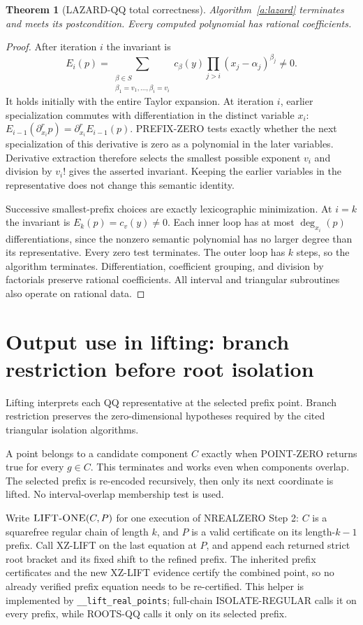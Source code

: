 \documentclass[11pt]{article}
\newtheorem{theorem}{Theorem}[section]
\theoremstyle{definition}
\newcommand{\alg}[1]{\textsc{#1}}
\begin{document}
\begin{theorem}[LAZARD-QQ total correctness]\label{t:lazard}
Algorithm~\ref{a:lazard} terminates and meets its postcondition. Every computed
polynomial has rational coefficients.
\end{theorem}
\begin{proof}
After iteration $i$ the invariant is
\[
 E_i(p)=\sum_{\substack{\beta\in S\\\beta_1=v_1,\ldots,\beta_i=v_i}}
 c_\beta(y)\prod_{j>i}(x_j-\alpha_j)^{\beta_j}\ne0.
\]
It holds initially with the entire Taylor expansion. At iteration $i$, earlier
specialization commutes with differentiation in the distinct variable $x_i$:
$E_{i-1}(\partial_{x_i}^r p)=\partial_{x_i}^r E_{i-1}(p)$.
PREFIX-ZERO tests exactly whether the next specialization of this derivative is
zero as a polynomial in the later variables. Derivative extraction therefore
selects the smallest possible exponent $v_i$ and division by $v_i!$ gives the
asserted invariant. Keeping the earlier variables in the representative does not
change this semantic identity.

Successive smallest-prefix choices are exactly lexicographic minimization. At
$i=k$ the invariant is $E_k(p)=c_v(y)\ne0$. Each inner loop has at most
$\deg_{x_i}(p)$ differentiations, since the nonzero semantic polynomial has no
larger degree than its representative. Every zero test terminates. The outer loop
has $k$ steps, so the algorithm terminates. Differentiation, coefficient grouping,
and division by factorials preserve rational coefficients. All interval and
triangular subroutines also operate on rational data.
\end{proof}

\section{Output use in lifting: branch restriction before root isolation}
Lifting interprets each QQ representative at the selected prefix point. Branch
restriction preserves the zero-dimensional hypotheses required by the cited
triangular isolation algorithms.

A point belongs to a candidate component $C$ exactly when POINT-ZERO returns
true for every $g\in C$. This terminates and works even when components overlap.
The selected prefix is re-encoded recursively, then only its next coordinate
is lifted. No interval-overlap membership test is used.

Write $\alg{LIFT-ONE}(C,P)$ for one execution of NREALZERO Step 2: $C$ is a
squarefree regular chain of length $k$, and $P$ is a valid certificate on its
length-$k-1$ prefix. Call XZ-LIFT on the last equation at $P$, and append each
returned strict root bracket and its fixed shift to the refined prefix.
The inherited prefix certificates and the new XZ-LIFT evidence certify the
combined point, so no already verified prefix equation needs to be re-certified.
This helper is implemented by \texttt{\_\_lift\_real\_points}; full-chain
ISOLATE-REGULAR calls it on every prefix, while ROOTS-QQ calls it only on its
selected prefix.
\end{document}
